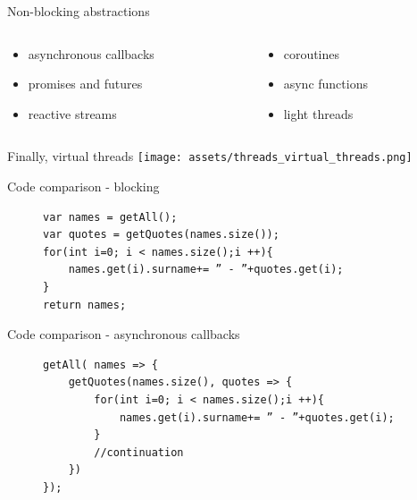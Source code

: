 \documentclass{beamer}
\begin{document}
\begin{frame}{Non-blocking abstractions}
    \begin{columns}
        \begin{column}{0.5\textwidth}
            \begin{itemize}
                \item asynchronous callbacks
                \item promises and futures
                \item reactive streams
            \end{itemize}
        \end{column}
        \begin{column}{0.5\textwidth}
            \begin{itemize}
                \item coroutines
                \item async functions
                \item light threads
            \end{itemize}
        \end{column}
    \end{columns}
\end{frame}
\begin{frame}{Finally, virtual threads}
    \texttt{[image: assets/threads\_virtual\_threads.png]}
\end{frame}
\begin{frame}[fragile]{Code comparison - blocking}
    \begin{figure}
        \begin{lstlisting}
var names = getAll();
var quotes = getQuotes(names.size());
for(int i=0; i < names.size();i ++){
    names.get(i).surname+= ” - ”+quotes.get(i);
}
return names;
        \end{lstlisting}
    \end{figure}
\end{frame}
\begin{frame}[fragile]{Code comparison - asynchronous callbacks}
    \begin{figure}
        \begin{lstlisting}
getAll( names => {
    getQuotes(names.size(), quotes => {
        for(int i=0; i < names.size();i ++){
            names.get(i).surname+= ” - ”+quotes.get(i);
        }
        //continuation
    })
});
        \end{lstlisting}
    \end{figure}
\end{frame}
\end{document}
